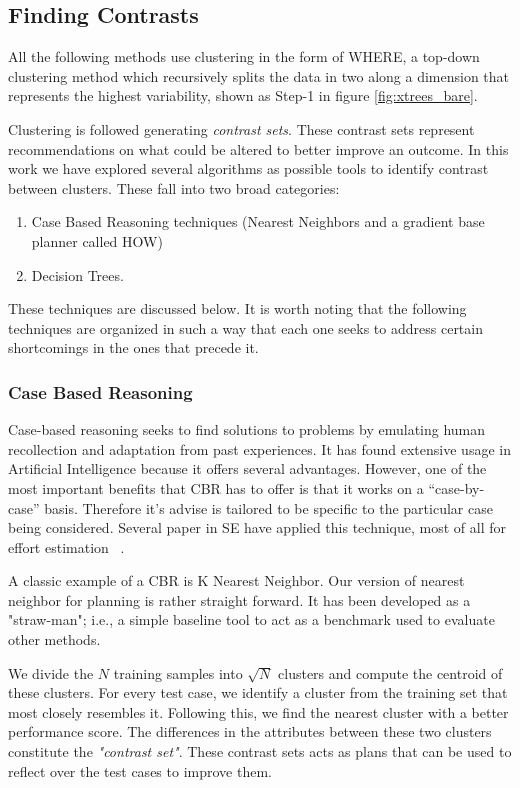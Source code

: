 \documentclass{sig-alternate}
\begin{document}
\subsection{Finding Contrasts}
All the following methods use clustering in the form of WHERE, a top-down clustering method which recursively splits the data in two along a dimension that represents the highest variability, shown as Step-1 in figure \ref{fig:xtrees_bare}. 

Clustering is followed generating \textit{contrast sets}. These contrast sets represent recommendations on what could be altered to better improve an outcome. In this work we have explored several algorithms as possible tools to identify contrast between clusters. These fall into two broad categories:
\begin{enumerate}
\item Case Based Reasoning techniques (Nearest Neighbors and a gradient base planner called HOW)
\item Decision Trees.
\end{enumerate}

These techniques are discussed below. It is worth noting that the following techniques are organized in such a way that each one seeks to address certain shortcomings in the ones that precede it. 

\subsubsection{Case Based Reasoning}

Case-based reasoning seeks to find solutions to problems by emulating human recollection and adaptation from past experiences. It has found extensive usage in Artificial Intelligence because it offers several advantages. However, one of the most important benefits that CBR has to offer is that it works on a ``case-by-case'' basis. Therefore it's advise is tailored to be specific to the particular case being considered. Several paper in SE have applied this technique, most of all for effort estimation ~\cite{keung2008analogy, 6600685, walkerden1999empirical, shepperd1997estimating, kocaguneli2010use}. 

A classic example of a CBR is K Nearest Neighbor. Our version of nearest neighbor for planning is rather straight forward. It has been developed as a "straw-man"; i.e., a simple baseline tool to act as a benchmark used to evaluate other methods. 

We divide the $N$ training samples into $\sqrt{N}$ clusters and compute the centroid of these clusters. For every test case, we identify a cluster from the training set that most closely resembles it. Following this, we find the nearest cluster with a better performance score. The differences in the attributes between these two clusters constitute the \textit{"contrast set"}. These contrast sets acts as plans that can be used to reflect over the test cases to improve them.
\end{document}
